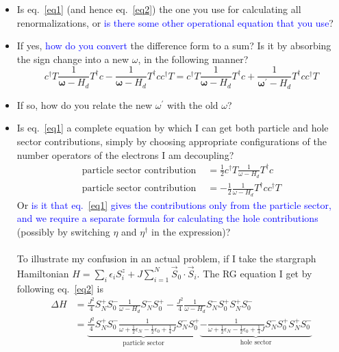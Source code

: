 \documentclass[14pt]{extarticle}
\begin{document}
\begin{itemize}
	\item Is eq.~\ref{eq1} (and hence eq.~\ref{eq2}) the one you use for calculating all renormalizations, or \textcolor{blue}{is there some other operational equation that you use}?
	\item If yes, \textcolor{blue}{how do you convert} the difference form to a sum? Is it by absorbing the sign change into a new \(\omega\), in the following manner?
\begin{equation}
	c^\dagger T \frac{1}{\pmb{\omega} - H_d}T^\dagger c - \frac{1}{\pmb{\omega} - H_d} T^\dagger c c^\dagger T = c^\dagger T \frac{1}{\pmb{\omega} - H_d}T^\dagger c + \frac{1}{\pmb{\omega^\prime} - H_d} T^\dagger c c^\dagger T
\end{equation}
	\item If so, how do you relate the new \(\omega^\prime\) with the old \(\omega\)?
	\item Is eq.~\ref{eq1} a complete equation by which I can get both particle and hole sector contributions, simply by choosing appropriate configurations of the number operators of the electrons I am decoupling?
		\begin{equation}\begin{aligned}
			\text{particle sector contribution }&=\frac{1}{2}c^\dagger T \frac{1}{\omega - H_d}T^\dagger c\\
			\text{particle sector contribution }&=-\frac{1}{2} \frac{1}{\omega - H_d} T^\dagger c c^\dagger T
\end{aligned}\end{equation}
Or \textcolor{blue}{is it that eq.~\ref{eq1} gives the contributions only from the particle sector, and we require a separate formula for calculating the hole contributions} (possibly by switching \(\eta\) and \(\eta^\dagger\) in the expression)?
\\\\ To illustrate my confusion in an actual problem, if I take the stargraph Hamiltonian \(H = \sum_i \epsilon_i S_i^z + J \sum_{i=1}^N \vec S_0 \cdot \vec S_i\). The RG equation I get by following eq.~\ref{eq2} is
		\begin{equation}\begin{aligned}
		\Delta H &=\frac{J^2}{4}S_N^+ S_0^- \frac{1}{\omega - H_d}S_N^- S_0^+ - \frac{J^2}{4}\frac{1}{\omega - H_d}S_N^- S_0^+ S_N^+ S_0^-\\
				 &= \underbrace{\frac{J^2}{4}S_N^+ S_0^- \frac{1}{\omega + \frac{1}{2}\epsilon_N - \frac{1}{2}\epsilon_0 + \frac{1}{4}J}S_N^- S_0^+}_\text{particle sector} \underbrace{- \frac{1}{\omega + \frac{1}{2}\epsilon_N - \frac{1}{2}\epsilon_0 + \frac{1}{4}J}S_N^- S_0^+ S_N^+ S_0^-}_\text{hole sector}\\

\end{aligned}
\end{equation}
\end{itemize}
\end{document}
